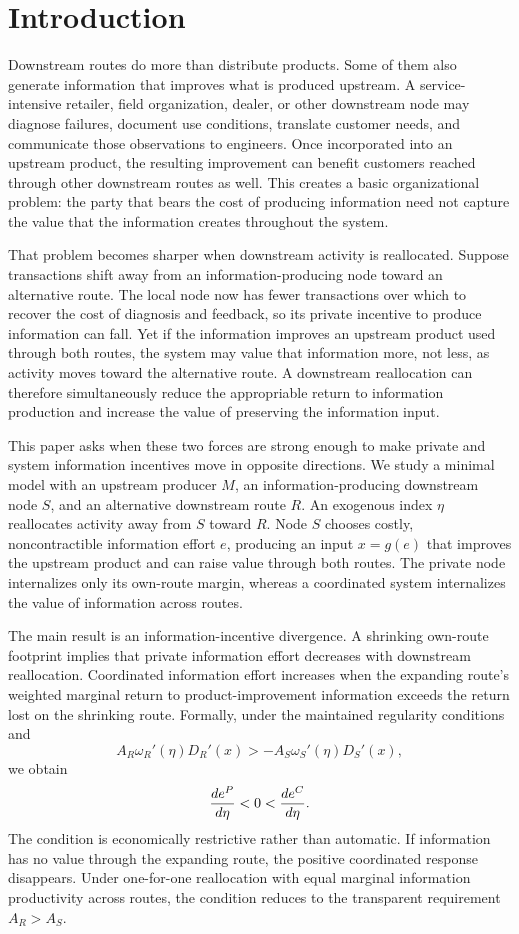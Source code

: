 \section{Introduction}\label{sec:introduction}

Downstream routes do more than distribute products. Some of them also generate information that improves what is produced upstream. A service-intensive retailer, field organization, dealer, or other downstream node may diagnose failures, document use conditions, translate customer needs, and communicate those observations to engineers. Once incorporated into an upstream product, the resulting improvement can benefit customers reached through other downstream routes as well. This creates a basic organizational problem: the party that bears the cost of producing information need not capture the value that the information creates throughout the system.

That problem becomes sharper when downstream activity is reallocated. Suppose transactions shift away from an information-producing node toward an alternative route. The local node now has fewer transactions over which to recover the cost of diagnosis and feedback, so its private incentive to produce information can fall. Yet if the information improves an upstream product used through both routes, the system may value that information more, not less, as activity moves toward the alternative route. A downstream reallocation can therefore simultaneously reduce the appropriable return to information production and increase the value of preserving the information input.

This paper asks when these two forces are strong enough to make private and system information incentives move in opposite directions. We study a minimal model with an upstream producer $M$, an information-producing downstream node $S$, and an alternative downstream route $R$. An exogenous index $\eta$ reallocates activity away from $S$ toward $R$. Node $S$ chooses costly, noncontractible information effort $e$, producing an input $x=g(e)$ that improves the upstream product and can raise value through both routes. The private node internalizes only its own-route margin, whereas a coordinated system internalizes the value of information across routes.

The main result is an information-incentive divergence. A shrinking own-route footprint implies that private information effort decreases with downstream reallocation. Coordinated information effort increases when the expanding route's weighted marginal return to product-improvement information exceeds the return lost on the shrinking route. Formally, under the maintained regularity conditions and
\[
A_R\omega_R'(\eta)D_R'(x)>-A_S\omega_S'(\eta)D_S'(x),
\]
we obtain
\[
\frac{de^{P}}{d\eta}<0<\frac{de^{C}}{d\eta}.
\]
The condition is economically restrictive rather than automatic. If information has no value through the expanding route, the positive coordinated response disappears. Under one-for-one reallocation with equal marginal information productivity across routes, the condition reduces to the transparent requirement $A_R>A_S$.


